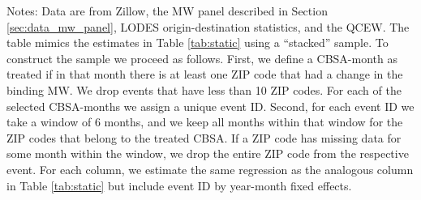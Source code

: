 \begin{table}[hbt!]
    \begin{minipage}{.95\textwidth} \footnotesize
        \vspace{2mm}
        Notes: 
        Data are from Zillow, the MW panel described in Section \ref{sec:data_mw_panel},
        LODES origin-destination statistics, and the QCEW.
        The table mimics the estimates in Table \ref{tab:static} using a 
        ``stacked'' sample.
        To construct the sample we proceed as follows.
        First, we define a CBSA-month as treated if in that month there is at 
        least one ZIP code that had a change in the binding MW.
        We drop events that have less than 10 ZIP codes.
        For each of the selected CBSA-months we assign a unique event ID. 
        Second, for each event ID we take a window of 6 months, and we keep all 
        months within that window for the ZIP codes that belong to the treated 
        CBSA.
        If a ZIP code has missing data for some month within the window, we drop 
        the entire ZIP code from the respective event.
        For each column, we estimate the same regression as the analogous column 
        in Table \ref{tab:static} but include event ID by year-month
        fixed effects.
    \end{minipage}
\end{table}
